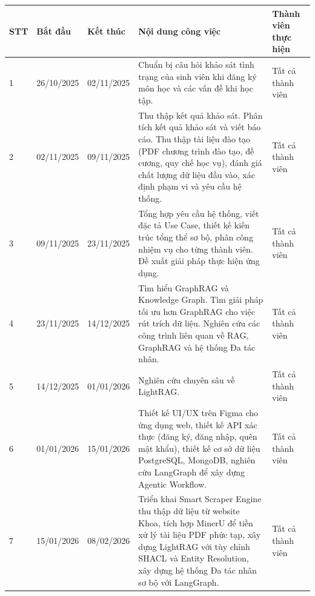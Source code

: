 \begin{refsection}
{\begin{longtable}{|C{0.9cm}|C{2.2cm}|C{2.2cm}|L{5.8cm}|L{2.4cm}|}
    \hline
    STT & Bắt đầu & Kết thúc & Nội dung công việc & Thành viên thực hiện \\
    \hline
    \endhead

    1 & 26/10/2025 & 02/11/2025 &
    Chuẩn bị câu hỏi khảo sát tình trạng của sinh viên khi đăng ký môn học và các vấn đề khi học tập.
    & Tất cả thành viên \\ \hline

    2 & 02/11/2025 & 09/11/2025 &
    Thu thập kết quả khảo sát. \newline
    Phân tích kết quả khảo sát và viết báo cáo. \newline
    Thu thập tài liệu đào tạo (PDF chương trình đào tạo, đề cương, quy chế học vụ), đánh giá chất lượng dữ liệu đầu vào, xác định phạm vi và yêu cầu hệ thống.
    & Tất cả thành viên \\ \hline

    3 & 09/11/2025 & 23/11/2025 &
    Tổng hợp yêu cầu hệ thống, viết đặc tả Use Case, thiết kế kiến trúc tổng thể sơ bộ, phân công nhiệm vụ cho từng thành viên. \newline
    Đề xuất giải pháp thực hiện ứng dụng.
    & Tất cả thành viên \\ \hline

    4 & 23/11/2025 & 14/12/2025 &
    Tìm hiểu GraphRAG và Knowledge Graph. \newline
    Tìm giải pháp tối ưu hơn GraphRAG cho việc rút trích dữ liệu. \newline
    Nghiên cứu các công trình liên quan về RAG, GraphRAG và hệ thống Đa tác nhân.
    & Tất cả thành viên \\ \hline

    5 & 14/12/2025 & 01/01/2026 &
    Nghiên cứu chuyên sâu về LightRAG.
    & Tất cả thành viên \\ \hline

    6 & 01/01/2026 & 15/01/2026 &
    Thiết kế UI/UX trên Figma cho ứng dụng web, thiết kế API xác thực (đăng ký, đăng nhập, quên mật khẩu), thiết kế cơ sở dữ liệu PostgreSQL, MongoDB, nghiên cứu LangGraph để xây dựng Agentic Workflow.
    & Tất cả thành viên \\ \hline

    7 & 15/01/2026 & 08/02/2026 &
    Triển khai Smart Scraper Engine thu thập dữ liệu từ website Khoa, tích hợp MinerU để tiền xử lý tài liệu PDF phức tạp, xây dựng LightRAG với tùy chỉnh SHACL và Entity Resolution, xây dựng hệ thống Đa tác nhân sơ bộ với LangGraph.
    & Tất cả thành viên \\ \hline


\end{longtable}}
\end{refsection}
